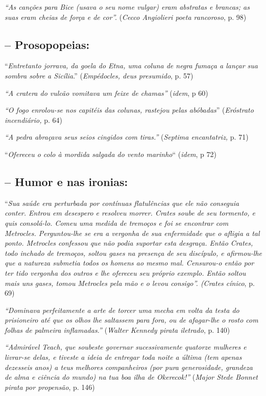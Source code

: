 \documentclass[12pt]{extarticle}
\begin{document}
\emph{``As canções para Bice (usava o seu nome vulgar) eram abstratas e
brancas; as suas eram cheias de força e de cor''.} (\emph{Cecco
Angiolieri poeta rancoroso}, p. 98)

\subsection{-- Prosopopeias:}

``\emph{Entretanto jorrava, da goela do Etna, uma coluna de negra fumaça
a lançar sua sombra sobre a Sicília}.'' (\emph{Empédocles, deus
presumido}, p. 57)

\emph{``A cratera do vulcão vomitava um feixe de chamas''} (\emph{idem},
p 60)

\emph{``O fogo enrolou-se nos capitéis das colunas, rastejou pelas
abóbadas}'' (\emph{Eróstrato incendiário,} p. 64)

\emph{``A pedra abraçava seus seios cingidos com tiras.''}
(\emph{Septima encantatriz,} p. 71)

``\emph{Ofereceu o colo à mordida salgada do vento marinho}``
(\emph{idem}, p 72)

\subsection{-- Humor e nas ironias:}

``\emph{Sua saúde era perturbada por contínuas flatulências que ele não
conseguia conter. Entrou em desespero e resolveu morrer. Crates soube de
seu tormento, e quis consolá-lo. Comeu uma medida de tremoços e foi se
encontrar com Metrocles. Perguntou-lhe se era a vergonha de sua
enfermidade que o afligia a tal ponto. Metrocles confessou que não podia
suportar esta desgraça. Então Crates, todo inchado de tremoços, soltou
gases na presença de seu discípulo, e afirmou-lhe que a natureza
submetia todos os homens ao mesmo mal. Censurou-o então por ter tido
vergonha dos outros e lhe ofereceu seu próprio exemplo. Então soltou
mais uns gases, tomou Metrocles pela mão e o levou consigo''. (Crates
cínico}, p. 69)

\emph{``Dominava perfeitamente a arte de torcer uma mecha em volta da
testa do prisioneiro até que os olhos lhe saltassem para fora, ou de
afagar-lhe o rosto com folhas de palmeira inflamadas.''} (\emph{Walter
Kennedy pirata iletrado}, p. 140)

\emph{``Admirável Teach, que soubeste governar sucessivamente quatorze
mulheres e livrar-se delas, e tiveste a ideia de entregar toda noite a
última (tem apenas dezesseis anos) a teus melhores companheiros (por
pura generosidade, grandeza de alma e ciência do mundo) na tua boa ilha
de Okerecok!''} (\emph{Major Stede Bonnet pirata por propensão}, p. 146)
\end{document}
